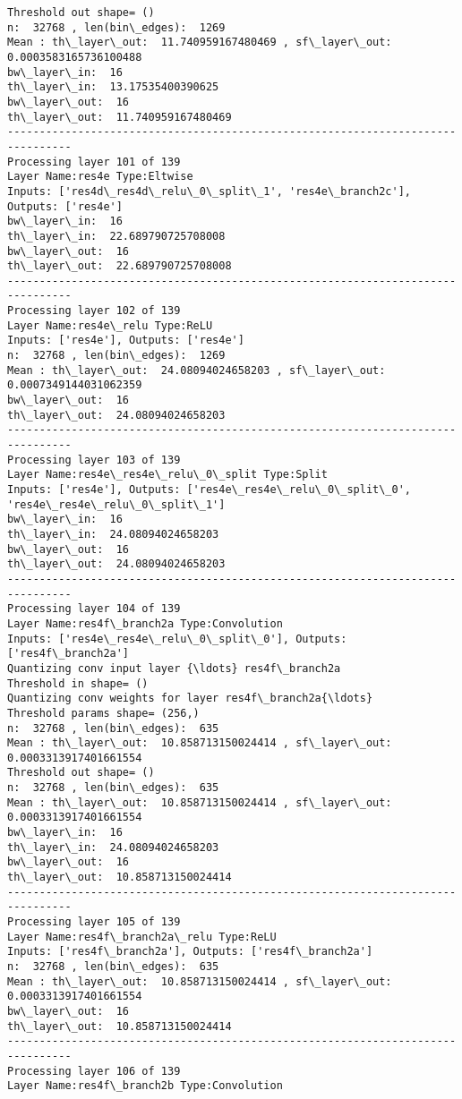 \documentclass[11pt]{article}
\begin{document}
\begin{Verbatim}[commandchars=\\\{\}]
Threshold out shape= ()
n:  32768 , len(bin\_edges):  1269
Mean : th\_layer\_out:  11.740959167480469 , sf\_layer\_out:  0.0003583165736100488
bw\_layer\_in:  16
th\_layer\_in:  13.17535400390625
bw\_layer\_out:  16
th\_layer\_out:  11.740959167480469
--------------------------------------------------------------------------------
Processing layer 101 of 139
Layer Name:res4e Type:Eltwise
Inputs: ['res4d\_res4d\_relu\_0\_split\_1', 'res4e\_branch2c'], Outputs: ['res4e']
bw\_layer\_in:  16
th\_layer\_in:  22.689790725708008
bw\_layer\_out:  16
th\_layer\_out:  22.689790725708008
--------------------------------------------------------------------------------
Processing layer 102 of 139
Layer Name:res4e\_relu Type:ReLU
Inputs: ['res4e'], Outputs: ['res4e']
n:  32768 , len(bin\_edges):  1269
Mean : th\_layer\_out:  24.08094024658203 , sf\_layer\_out:  0.0007349144031062359
bw\_layer\_out:  16
th\_layer\_out:  24.08094024658203
--------------------------------------------------------------------------------
Processing layer 103 of 139
Layer Name:res4e\_res4e\_relu\_0\_split Type:Split
Inputs: ['res4e'], Outputs: ['res4e\_res4e\_relu\_0\_split\_0', 'res4e\_res4e\_relu\_0\_split\_1']
bw\_layer\_in:  16
th\_layer\_in:  24.08094024658203
bw\_layer\_out:  16
th\_layer\_out:  24.08094024658203
--------------------------------------------------------------------------------
Processing layer 104 of 139
Layer Name:res4f\_branch2a Type:Convolution
Inputs: ['res4e\_res4e\_relu\_0\_split\_0'], Outputs: ['res4f\_branch2a']
Quantizing conv input layer {\ldots} res4f\_branch2a
Threshold in shape= ()
Quantizing conv weights for layer res4f\_branch2a{\ldots}
Threshold params shape= (256,)
n:  32768 , len(bin\_edges):  635
Mean : th\_layer\_out:  10.858713150024414 , sf\_layer\_out:  0.0003313917401661554
Threshold out shape= ()
n:  32768 , len(bin\_edges):  635
Mean : th\_layer\_out:  10.858713150024414 , sf\_layer\_out:  0.0003313917401661554
bw\_layer\_in:  16
th\_layer\_in:  24.08094024658203
bw\_layer\_out:  16
th\_layer\_out:  10.858713150024414
--------------------------------------------------------------------------------
Processing layer 105 of 139
Layer Name:res4f\_branch2a\_relu Type:ReLU
Inputs: ['res4f\_branch2a'], Outputs: ['res4f\_branch2a']
n:  32768 , len(bin\_edges):  635
Mean : th\_layer\_out:  10.858713150024414 , sf\_layer\_out:  0.0003313917401661554
bw\_layer\_out:  16
th\_layer\_out:  10.858713150024414
--------------------------------------------------------------------------------
Processing layer 106 of 139
Layer Name:res4f\_branch2b Type:Convolution

\end{Verbatim}
\end{document}
